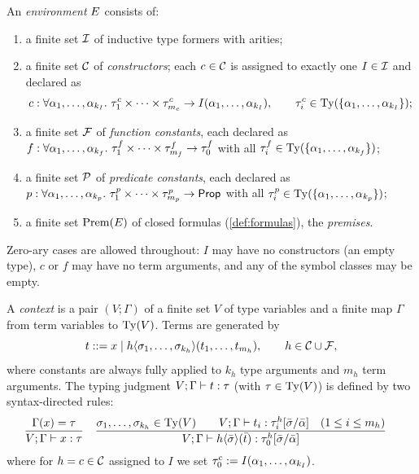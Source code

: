 \begin{definition}[Environments]
  \label{def:environment}
  An \emph{environment} $E$ consists of:
  \begin{enumerate}[label=(\alph*)]
  \item a finite set $\mathcal{I}$ of inductive type formers with arities;
  \item a finite set $\mathcal{C}$ of \emph{constructors}; each $c \in \mathcal{C}$
    is assigned to exactly one $I \in \mathcal{I}$ and declared as
    \[
      c : \forall \alpha_1,\dots,\alpha_{k_I}.\
          \tau^c_1 \times \dots \times \tau^c_{m_c} \rightarrow I(\alpha_1,\dots,\alpha_{k_I}),
      \qquad \tau^c_i \in \mathrm{Ty}(\{\alpha_1,\dots,\alpha_{k_I}\});
    \]
  \item a finite set $\mathcal{F}$ of \emph{function constants}, each declared as
    $f : \forall \alpha_1,\dots,\alpha_{k_f}.\ \tau^f_1 \times \dots \times
    \tau^f_{m_f} \rightarrow \tau^f_0$ with all $\tau^f_i \in
    \mathrm{Ty}(\{\alpha_1,\dots,\alpha_{k_f}\})$;
  \item a finite set $\mathcal{P}$ of \emph{predicate constants}, each declared as
    $p : \forall \alpha_1,\dots,\alpha_{k_p}.\ \tau^p_1 \times \dots \times
    \tau^p_{m_p} \rightarrow \mathsf{Prop}$ with all $\tau^p_i \in
    \mathrm{Ty}(\{\alpha_1,\dots,\alpha_{k_p}\})$;
  \item a finite set $\mathrm{Prem}(E)$ of closed formulas
    (\cref{def:formulas}), the \emph{premises}.
  \end{enumerate}
  Zero-ary cases are allowed throughout: $I$ may have no constructors (an
  empty type), $c$ or $f$ may have no term arguments, and any of the symbol
  classes may be empty.
\end{definition}

\begin{definition}
  \label{def:terms}
  A \emph{context} is a pair $(V;\Gamma)$ of a finite set $V$ of type
  variables and a finite map $\Gamma$ from term variables to $\mathrm{Ty}(V)$.
  Terms are generated by
  \[
    t ::= x \mid h\langle\sigma_1,\dots,\sigma_{k_h}\rangle(t_1,\dots,t_{m_h}),
    \qquad h \in \mathcal{C} \cup \mathcal{F},
  \]
  where constants are always fully applied to $k_h$ type arguments and
  $m_h$ term arguments.  The typing judgment $V;\Gamma\vdash t : \tau$
  (with $\tau \in \mathrm{Ty}(V)$) is defined by two syntax-directed rules:
  \begin{align*}
    &\frac{\Gamma(x) = \tau}{V;\Gamma\vdash x : \tau}
    &&\frac{
      \sigma_1,\dots,\sigma_{k_h} \in \mathrm{Ty}(V) \qquad
      V;\Gamma\vdash t_i : \tau^h_i[\bar{\sigma}/\bar{\alpha}]
      \quad (1 \le i \le m_h)
    }{
      V;\Gamma\vdash h\langle\bar{\sigma}\rangle(\bar{t}) :
        \tau^h_0[\bar{\sigma}/\bar{\alpha}]
    }
  \end{align*}
  where for $h = c \in \mathcal{C}$ assigned to $I$ we set
  $\tau^c_0 \mathrel{:=} I(\alpha_1,\dots,\alpha_{k_I})$.
\end{definition}

